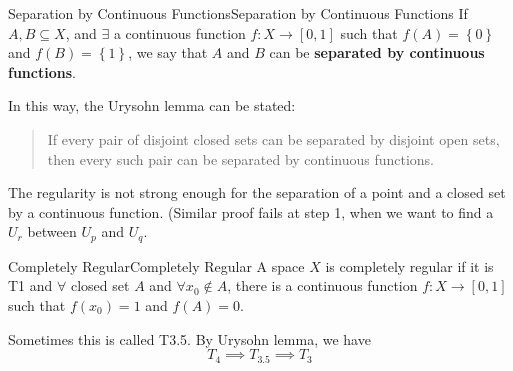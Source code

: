 \documentclass[../main.tex]{subfiles}
\begin{document}
\begin{definition}{Separation by Continuous Functions}{Separation by Continuous Functions}
	If $A,B \subseteq X$, and $\exists $ a continuous function $f: X \rightarrow [0,1]$ such that $f(A) = \left\{ 0 \right\}$ and $f(B) = \left\{ 1 \right\}$, we say that $A$ and $B$ can be \textbf{separated by continuous functions}.
\end{definition}

In this way, the Urysohn lemma can be stated:
\begin{quote}
	If every pair of disjoint closed sets can be separated by disjoint open sets, then every such pair can be separated by continuous functions.
\end{quote}

\begin{remark}
The regularity is not strong enough for the separation of a point and a closed set by a continuous function. (Similar proof fails at step 1, when we want to find a $U_r$ between $U_p$ and $U_q$.
\end{remark}

\begin{definition}{Completely Regular}{Completely Regular}
	A space $X$ is completely regular if it is T1 and $\forall $ closed set $A$ and $\forall x_0\notin A$, there is a continuous function $f: X \rightarrow [0,1]$ such that $f(x_0)=1$ and $f(A) = 0$.
\end{definition}

Sometimes this is called T3.5. By Urysohn lemma, we have
\begin{equation*}
	T_4 \implies T_{3.5} \implies T_3
\end{equation*}
\end{document}
